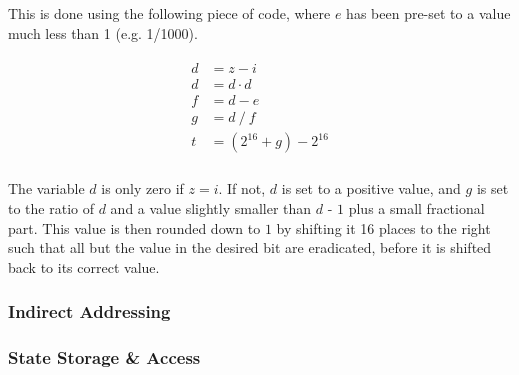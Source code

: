 \documentclass[Master.tex]{subfiles}
\begin{document}
This is done using the following piece of code, where $e$ has been pre-set to a value much less than 1 (e.g. 1/1000).

\begin{gather*}
\begin{aligned}
d &= z - i \\
d &= d \cdot d \\
f &= d - e \\
g &= d\ /\ f \\[1ex]
t &= (2^{16} + g) - 2^{16} \\
\end{aligned}
\end{gather*}

The variable $d$ is only zero if $z = i$. If not, $d$ is set to a positive value, and $g$ is set to the ratio of $d$ and a value slightly smaller than $d$ - $1$ plus a small fractional part. This value is then rounded down to $1$ by shifting it 16 places to the right such that all but the value in the desired bit are eradicated, before it is shifted back to its correct value.

\subsubsection{Indirect Addressing}

\subsubsection{State Storage \& Access}
\end{document}

